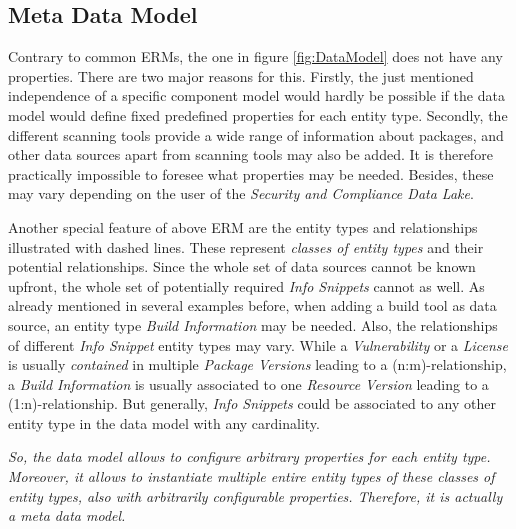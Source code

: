 \subsection{Meta Data Model}
Contrary to common ERMs, the one in figure \ref{fig:DataModel} does not have any properties. There are two major reasons for this. Firstly, the just mentioned independence of a specific component model would hardly be possible if the data model would define fixed predefined properties for each entity type. Secondly, the different scanning tools provide a wide range of information about packages, and other data sources apart from scanning tools may also be added. It is therefore practically impossible to foresee what properties may be needed. Besides, these may vary depending on the user of the \emph{Security and Compliance Data Lake}.\par
Another special feature of above ERM are the entity types and relationships illustrated with dashed lines. These represent \emph{classes of entity types} and their potential relationships. Since the whole set of data sources cannot be known upfront, the whole set of potentially required \emph{Info Snippets} cannot as well. As already mentioned in several examples before, when adding a build tool as data source, an entity type \emph{Build Information} may be needed. Also, the relationships of different \emph{Info Snippet} entity types may vary. While a \emph{Vulnerability} or a \emph{License} is usually \emph{contained} in multiple \emph{Package Versions} leading to a (n:m)-relationship, a \emph{Build Information} is usually associated to one \emph{Resource Version} leading to a (1:n)-relationship. But generally, \emph{Info Snippets} could be associated to any other entity type in the data model with any cardinality.\par
\emph{So, the data model allows to configure arbitrary properties for each entity type. Moreover, it allows to instantiate multiple entire entity types of these classes of entity types, also with arbitrarily configurable properties. Therefore, it is actually a meta data model.}\\

